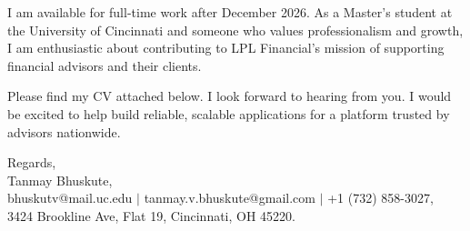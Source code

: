 \documentclass[11pt]{letter}
\begin{document}
\begin{letter}{}
I am available for full-time work after December 2026. As a Master's student at the University of Cincinnati and someone who values professionalism and growth, I am enthusiastic about contributing to LPL Financial's mission of supporting financial advisors and their clients.

Please find my CV attached below. I look forward to hearing from you. I would be excited to help build reliable, scalable applications for a platform trusted by advisors nationwide.

{\setlength{\parskip}{0pt}
Regards,\\
Tanmay Bhuskute,\\
bhuskutv@mail.uc.edu $\mid$ tanmay.v.bhuskute@gmail.com $\mid$ +1 (732) 858-3027,\\
3424 Brookline Ave, Flat 19, Cincinnati, OH 45220.
}

\end{letter}
\end{document}
